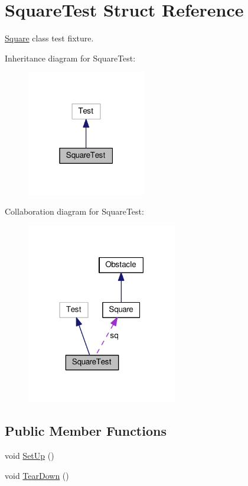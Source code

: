 \hypertarget{structSquareTest}{}\section{Square\+Test Struct Reference}
\label{structSquareTest}


\hyperlink{classSquare}{Square} class test fixture.  




Inheritance diagram for Square\+Test\+:
\nopagebreak
\begin{figure}[H]
\begin{center}
\leavevmode
\includegraphics[width=147pt]{structSquareTest__inherit__graph}
\end{center}
\end{figure}


Collaboration diagram for Square\+Test\+:
\nopagebreak
\begin{figure}[H]
\begin{center}
\leavevmode
\includegraphics[width=186pt]{structSquareTest__coll__graph}
\end{center}
\end{figure}
\subsection*{Public Member Functions}
\begin{DoxyCompactItemize}
\item 
void \hyperlink{structSquareTest_ac719b65aeeaff1b1af8df1edff6f65d2}{Set\+Up} ()
\item 
void \hyperlink{structSquareTest_a30608c5d65d639a9957447218dcc997c}{Tear\+Down} ()
\end{DoxyCompactItemize}
